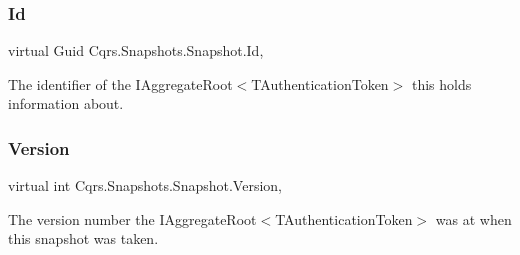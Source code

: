 \subsubsection{\texorpdfstring{Id}{Id}}
{\footnotesize\ttfamily virtual Guid Cqrs.\+Snapshots.\+Snapshot.\+Id\hspace{0.3cm}{\ttfamily [get]}, {\ttfamily [set]}}



The identifier of the I\+Aggregate\+Root$<$\+T\+Authentication\+Token$>$ this holds information about. 

\mbox{\label{classCqrs_1_1Snapshots_1_1Snapshot_a59c0a399430e5f4a1b27d999c3bb5d4f_a59c0a399430e5f4a1b27d999c3bb5d4f}} 
\subsubsection{\texorpdfstring{Version}{Version}}
{\footnotesize\ttfamily virtual int Cqrs.\+Snapshots.\+Snapshot.\+Version\hspace{0.3cm}{\ttfamily [get]}, {\ttfamily [set]}}



The version number the I\+Aggregate\+Root$<$\+T\+Authentication\+Token$>$ was at when this snapshot was taken. 

